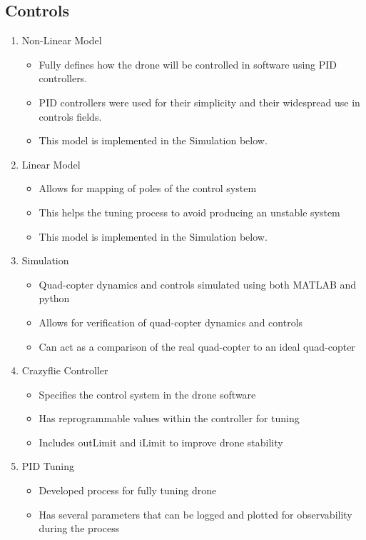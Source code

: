 \documentclass[12pt, titlepage]{article}
\begin{document}
\subsection{Controls}
\begin{enumerate}
		\item Non-Linear Model
		\begin{itemize}
			\item Fully defines how the drone will be controlled in software using PID controllers.
			\item PID controllers were used for their simplicity and their widespread use in controls fields.
			\item This model is implemented in the Simulation below.
		\end{itemize}
		\item Linear Model
		\begin{itemize}
			\item Allows for mapping of poles of the control system
			\item This helps the tuning process to avoid producing an unstable system
			\item This model is implemented in the Simulation below.
		\end{itemize}
		\item Simulation
		\begin{itemize}
			\item Quad-copter dynamics and controls simulated using both MATLAB and python
			\item Allows for verification of quad-copter dynamics and controls
			\item Can act as a comparison of the real quad-copter to an ideal quad-copter
		\end{itemize}
		\item Crazyflie Controller
		\begin{itemize}
			\item Specifies the control system in the drone software
			\item Has reprogrammable values within the controller for tuning
			\item Includes outLimit and iLimit to improve drone stability
		\end{itemize}
		\item PID Tuning
		\begin{itemize}
			\item Developed process for fully tuning drone
			\item Has several parameters that can be logged and plotted for observability during the process
		\end{itemize}
\end{enumerate}
\end{document}

